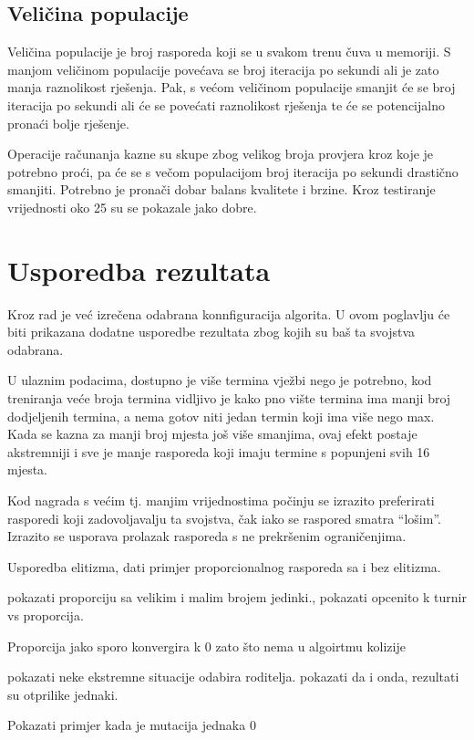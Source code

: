 \documentclass[times, utf8, zavrsni]{fer}
\begin{document}
\section{Veličina populacije}

Veličina populacije je broj rasporeda koji se u svakom trenu čuva u memoriji. S manjom veličinom populacije povećava se broj iteracija po sekundi ali je zato manja raznolikost rješenja. Pak, s većom veličinom populacije smanjit će se broj iteracija po sekundi ali će se povećati raznolikost rješenja te će se potencijalno pronaći bolje rješenje.

Operacije računanja kazne su skupe zbog velikog broja provjera kroz koje je potrebno proći, pa će se s večom populacijom broj iteracija po sekundi drastično smanjiti. Potrebno je pronači dobar balans kvalitete i brzine. Kroz testiranje vrijednosti oko 25 su se pokazale jako dobre.

\chapter{Usporedba rezultata}

Kroz rad je već izrečena odabrana konnfiguracija algorita. U ovom poglavlju će biti prikazana dodatne usporedbe rezultata zbog kojih su baš ta svojstva odabrana.

U ulaznim podacima, dostupno je više termina vježbi nego je potrebno, kod treniranja veće broja termina vidljivo je kako pno vište termina ima manji broj dodjeljenih termina, a nema gotov niti jedan termin koji ima više nego max. Kada se kazna za manji broj mjesta još više smanjima, ovaj efekt postaje akstremniji i sve je manje rasporeda koji imaju termine s popunjeni svih 16 mjesta.

Kod nagrada s većim tj. manjim vrijednostima počinju se izrazito preferirati rasporedi koji zadovoljavalju ta svojstva, čak iako se raspored smatra ``lošim''. Izrazito se usporava prolazak rasporeda s ne prekršenim ograničenjima.

Usporedba elitizma, dati primjer proporcionalnog rasporeda sa i bez elitizma.

pokazati proporciju sa velikim i malim brojem jedinki., pokazati opcenito k turnir vs proporcija.

Proporcija jako sporo konvergira k 0 zato što nema u algoirtmu kolizije

pokazati neke ekstremne situacije odabira roditelja. pokazati da i onda, rezultati su otprilike jednaki.

Pokazati primjer kada je mutacija jednaka 0
\end{document}
